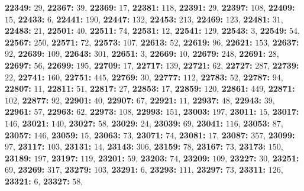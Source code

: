 \textsf{\bfseries 22349:} $29$, \textsf{\bfseries 22367:} $39$, \textsf{\bfseries 22369:} $17$, \textsf{\bfseries 22381:} $118$, \textsf{\bfseries 22391:} $29$, \textsf{\bfseries 22397:} $108$, \textsf{\bfseries 22409:} $15$, \textsf{\bfseries 22433:} $6$, \textsf{\bfseries 22441:} $190$, \textsf{\bfseries 22447:} $132$, \textsf{\bfseries 22453:} $213$, \textsf{\bfseries 22469:} $123$, \textsf{\bfseries 22481:} $31$, \textsf{\bfseries 22483:} $21$, \textsf{\bfseries 22501:} $40$, \textsf{\bfseries 22511:} $74$, \textsf{\bfseries 22531:} $12$, \textsf{\bfseries 22541:} $129$, \textsf{\bfseries 22543:} $3$, \textsf{\bfseries 22549:} $54$, \textsf{\bfseries 22567:} $250$, \textsf{\bfseries 22571:} $72$, \textsf{\bfseries 22573:} $107$, \textsf{\bfseries 22613:} $52$, \textsf{\bfseries 22619:} $96$, \textsf{\bfseries 22621:} $153$, \textsf{\bfseries 22637:} $92$, \textsf{\bfseries 22639:} $109$, \textsf{\bfseries 22643:} $301$, \textsf{\bfseries 22651:} $3$, \textsf{\bfseries 22669:} $10$, \textsf{\bfseries 22679:} $248$, \textsf{\bfseries 22691:} $28$, \textsf{\bfseries 22697:} $56$, \textsf{\bfseries 22699:} $195$, \textsf{\bfseries 22709:} $17$, \textsf{\bfseries 22717:} $139$, \textsf{\bfseries 22721:} $62$, \textsf{\bfseries 22727:} $287$, \textsf{\bfseries 22739:} $22$, \textsf{\bfseries 22741:} $160$, \textsf{\bfseries 22751:} $445$, \textsf{\bfseries 22769:} $30$, \textsf{\bfseries 22777:} $112$, \textsf{\bfseries 22783:} $52$, \textsf{\bfseries 22787:} $94$, \textsf{\bfseries 22807:} $11$, \textsf{\bfseries 22811:} $51$, \textsf{\bfseries 22817:} $27$, \textsf{\bfseries 22853:} $17$, \textsf{\bfseries 22859:} $120$, \textsf{\bfseries 22861:} $449$, \textsf{\bfseries 22871:} $102$, \textsf{\bfseries 22877:} $92$, \textsf{\bfseries 22901:} $40$, \textsf{\bfseries 22907:} $67$, \textsf{\bfseries 22921:} $11$, \textsf{\bfseries 22937:} $48$, \textsf{\bfseries 22943:} $39$, \textsf{\bfseries 22961:} $57$, \textsf{\bfseries 22963:} $62$, \textsf{\bfseries 22973:} $108$, \textsf{\bfseries 22993:} $151$, \textsf{\bfseries 23003:} $197$, \textsf{\bfseries 23011:} $15$, \textsf{\bfseries 23017:} $146$, \textsf{\bfseries 23021:} $140$, \textsf{\bfseries 23027:} $58$, \textsf{\bfseries 23029:} $24$, \textsf{\bfseries 23039:} $69$, \textsf{\bfseries 23041:} $116$, \textsf{\bfseries 23053:} $87$, \textsf{\bfseries 23057:} $146$, \textsf{\bfseries 23059:} $15$, \textsf{\bfseries 23063:} $73$, \textsf{\bfseries 23071:} $74$, \textsf{\bfseries 23081:} $17$, \textsf{\bfseries 23087:} $357$, \textsf{\bfseries 23099:} $97$, \textsf{\bfseries 23117:} $103$, \textsf{\bfseries 23131:} $14$, \textsf{\bfseries 23143:} $306$, \textsf{\bfseries 23159:} $78$, \textsf{\bfseries 23167:} $73$, \textsf{\bfseries 23173:} $150$, \textsf{\bfseries 23189:} $197$, \textsf{\bfseries 23197:} $119$, \textsf{\bfseries 23201:} $59$, \textsf{\bfseries 23203:} $74$, \textsf{\bfseries 23209:} $109$, \textsf{\bfseries 23227:} $30$, \textsf{\bfseries 23251:} $69$, \textsf{\bfseries 23269:} $317$, \textsf{\bfseries 23279:} $103$, \textsf{\bfseries 23291:} $6$, \textsf{\bfseries 23293:} $111$, \textsf{\bfseries 23297:} $73$, \textsf{\bfseries 23311:} $126$, \textsf{\bfseries 23321:} $6$, \textsf{\bfseries 23327:} $58$, 
